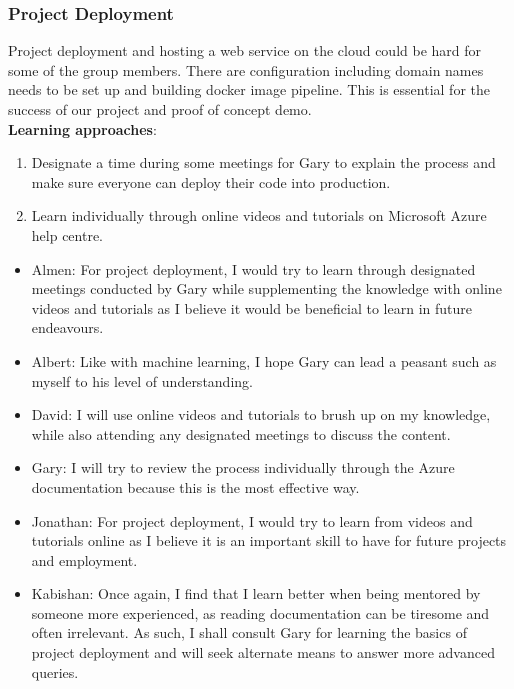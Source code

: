 \documentclass[12pt,letterpaper]{article}
\begin{document}
\subsubsection{Project Deployment}
Project deployment and hosting a web service on the cloud could be hard for some
of the group members. There are configuration including domain names needs to be
set up and building docker image pipeline. This is essential for the success of
our project and proof of concept demo. \\[.1in]
\noindent \textbf{Learning approaches}:
\begin{enumerate}
    \item Designate a time during some meetings for Gary to explain the process
    and make sure everyone can deploy their code into production.
    \item Learn individually through online videos and tutorials on Microsoft
    Azure help centre.
\end{enumerate}

\begin{itemize}
    \item Almen: For project deployment, I would try to learn through designated
    meetings conducted by Gary while supplementing the knowledge with online
    videos and tutorials as I believe it would be beneficial to learn in future
    endeavours.
    \item Albert: Like with machine learning, I hope Gary can lead a peasant
    such as myself to his level of understanding.
    \item David: I will use online videos and tutorials to brush up on my
    knowledge, while also attending any designated meetings to discuss the
    content.
    \item Gary: I will try to review the process individually through the Azure
    documentation because this is the most effective way.
    \item Jonathan: For project deployment, I would try to learn from videos and
    tutorials online as I believe it is an important skill to have for future
    projects and employment.
    \item Kabishan: Once again, I find that I learn better when being mentored
    by someone more experienced, as reading documentation can be tiresome and
    often irrelevant. As such, I shall consult Gary for learning the basics of
    project deployment and will seek alternate means to answer more advanced
    queries.
\end{itemize}

\newpage

\printbibliography
\end{document}
